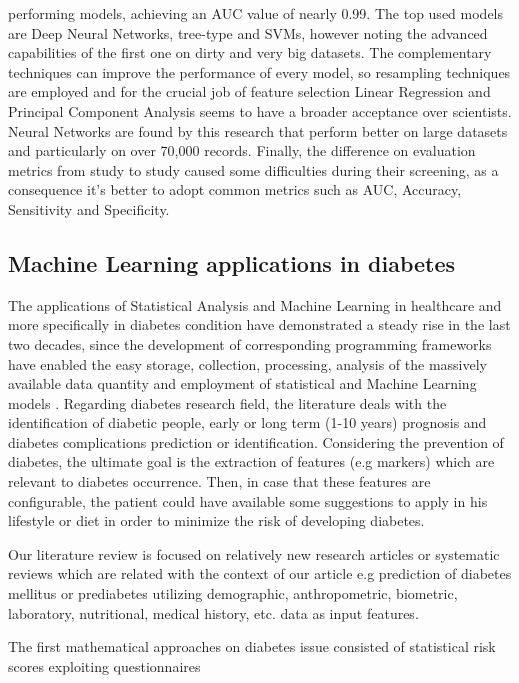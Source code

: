 \documentclass[journal,article,submit,pdftex,moreauthors]{Definitions/mdpi}
\begin{document}
performing models, achieving an AUC value of nearly 0.99. The top used models are Deep Neural Networks, tree-type and SVMs, however
noting the advanced capabilities of the first one on dirty and very big datasets. The complementary techniques can improve the 
performance of every model, so resampling techniques are employed and for the crucial job of feature selection Linear Regression
and Principal Component Analysis seems to have a broader acceptance over scientists. Neural Networks are found by this research 
that perform better on large datasets and particularly on over 70,000 records. Finally, the difference on evaluation metrics from
study to study caused some difficulties during their screening, as a consequence it's better to adopt common metrics such as AUC,
Accuracy, Sensitivity and Specificity.

\subsection{Machine Learning applications in diabetes}
The applications of Statistical Analysis and 
Machine Learning in healthcare and more specifically in diabetes 
condition  have demonstrated a steady rise in the last two decades, 
since the development of corresponding programming frameworks have 
enabled the easy storage, collection, processing, analysis of the 
massively available data quantity and employment of statistical and
Machine Learning models \cite{frank2005weka, scikit-learn,  
seabold2010statsmodels}. Regarding diabetes research field, the 
literature deals with the  identification of diabetic people, early or
long term (1-10 years) prognosis and diabetes complications
prediction or identification. Considering the prevention of diabetes, the ultimate
goal is the extraction of features (e.g markers) which are relevant to diabetes
occurrence. Then, in case that  these features are configurable, the patient could 
have available some suggestions to apply in his lifestyle or diet in order to 
minimize the risk of developing diabetes.   
 \par Our literature review is focused on
relatively new research articles or systematic reviews which are 
related with the context of our article e.g prediction of diabetes
mellitus or prediabetes utilizing demographic, anthropometric,
biometric, laboratory, nutritional, medical history, etc. data as
input features.
\par The first mathematical approaches  on diabetes 
issue consisted of statistical risk scores exploiting questionnaires
\end{document}
